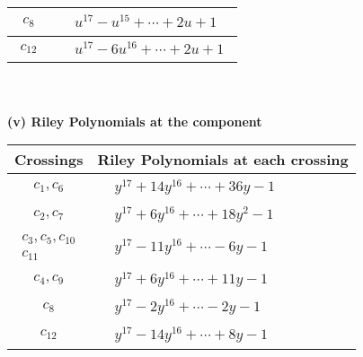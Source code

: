 \documentclass[1p]{elsarticle_modified}
\theoremstyle{definition}
\begin{document}
\begin{tabular}{m{50pt}|m{274pt}}
\hline $$\begin{aligned}c_{8}\end{aligned}$$&$\begin{aligned}
&u^{17}- u^{15}+\cdots+2 u+1
\end{aligned}$\\
\hline $$\begin{aligned}c_{12}\end{aligned}$$&$\begin{aligned}
&u^{17}-6 u^{16}+\cdots+2 u+1
\end{aligned}$\\
\hline
\end{tabular}\\~\\
\newpage\renewcommand{\arraystretch}{1}
\flushleft \textbf{(v) Riley Polynomials at the component}\newline \\
\begin{tabular}{m{50pt}|m{274pt}}
Crossings & \hspace{64pt}Riley Polynomials at each crossing \\
\hline $$\begin{aligned}c_{1},c_{6}\end{aligned}$$&$\begin{aligned}
&y^{17}+14 y^{16}+\cdots+36 y-1
\end{aligned}$\\
\hline $$\begin{aligned}c_{2},c_{7}\end{aligned}$$&$\begin{aligned}
&y^{17}+6 y^{16}+\cdots+18 y^2-1
\end{aligned}$\\
\hline $$\begin{aligned}c_{3},c_{5},c_{10}\\c_{11}\end{aligned}$$&$\begin{aligned}
&y^{17}-11 y^{16}+\cdots-6 y-1
\end{aligned}$\\
\hline $$\begin{aligned}c_{4},c_{9}\end{aligned}$$&$\begin{aligned}
&y^{17}+6 y^{16}+\cdots+11 y-1
\end{aligned}$\\
\hline $$\begin{aligned}c_{8}\end{aligned}$$&$\begin{aligned}
&y^{17}-2 y^{16}+\cdots-2 y-1
\end{aligned}$\\
\hline $$\begin{aligned}c_{12}\end{aligned}$$&$\begin{aligned}
&y^{17}-14 y^{16}+\cdots+8 y-1
\end{aligned}$\\
\hline
\end{tabular}\\~\\
\end{document}
